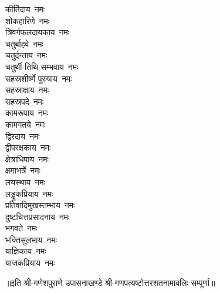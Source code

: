 \begin{multicols}{2}
\begin{flushleft}
कीर्तिदाय~नमः\\
शोकहारिणे~नमः\\
त्रिवर्गफलदायकाय~नमः\\
चतुर्बाहवे~नमः\\
चतुर्दन्ताय~नमः\hfill{}\\
चतुर्थी-तिथि-सम्भवाय~नमः\\
सहस्रशीर्ष्णे पुरुषाय~नमः\\
सहस्राक्षाय~नमः\\
सहस्रपदे~नमः\\
कामरूपाय~नमः\\
कामगतये~नमः\\
द्विरदाय~नमः\\
द्वीपरक्षकाय~नमः\\
क्षेत्राधिपाय~नमः\\
क्षमाभर्त्रे~नमः\hfill{}\\
लयस्थाय~नमः\\
लड्डुकप्रियाय~नमः\\
प्रतिवादिमुखस्तम्भाय~नमः\\
दुष्टचित्तप्रसादनाय~नमः\\
भगवते~नमः\\
भक्तिसुलभाय~नमः\\
याज्ञिकाय~नमः\\
याजकप्रियाय~नमः\\
\end{flushleft}
\end{multicols}
॥इति श्री-गणेशपुराणे उपासनाखण्डे श्री-गणपत्यष्टोत्तरशतनामावलिः सम्पूर्णा॥
